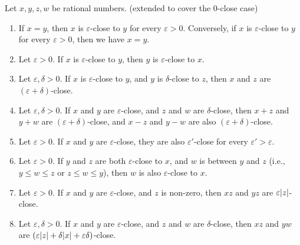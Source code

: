 \setcounter{theorem}{6}
\begin{proposition}\label{4.3.7}
Let \(x, y, z, w\) be rational numbers.
(extended to cover the \(0\)-close case)
\begin{enumerate}
    \item If \(x = y\), then \(x\) is \(\varepsilon\)-close to \(y\) for every \(\varepsilon > 0\).
    Conversely, if \(x\) is \(\varepsilon\)-close to \(y\) for every \(\varepsilon > 0\), then we have \(x = y\).
    \item Let \(\varepsilon > 0\).
    If \(x\) is \(\varepsilon\)-close to \(y\), then \(y\) is \(\varepsilon\)-close to \(x\).
    \item Let \(\varepsilon, \delta > 0\).
    If \(x\) is \(\varepsilon\)-close to \(y\), and \(y\) is \(\delta\)-close to \(z\), then \(x\) and \(z\) are \((\varepsilon + \delta)\)-close.
    \item Let \(\varepsilon, \delta > 0\).
    If \(x\) and \(y\) are \(\varepsilon\)-close, and \(z\) and \(w\) are \(\delta\)-close, then \(x + z\) and \(y + w\) are \((\varepsilon + \delta)\)-close, and \(x - z\) and \(y - w\) are also \((\varepsilon + \delta)\)-close.
    \item Let \(\varepsilon > 0\).
    If \(x\) and \(y\) are \(\varepsilon\)-close, they are also \(\varepsilon'\)-close for every \(\varepsilon' > \varepsilon\).
    \item Let \(\varepsilon > 0\).
    If \(y\) and \(z\) are both \(\varepsilon\)-close to \(x\), and \(w\) is between \(y\) and \(z\) (i.e., \(y \leq w \leq z\) or \(z \leq w \leq y\)), then \(w\) is also \(\varepsilon\)-close to \(x\).
    \item Let \(\varepsilon > 0\).
    If \(x\) and \(y\) are \(\varepsilon\)-close, and \(z\) is non-zero, then \(xz\) and \(yz\) are \(\varepsilon\abs*{z}\)-close.
    \item Let \(\varepsilon, \delta > 0\).
    If \(x\) and \(y\) are \(\varepsilon\)-close, and \(z\) and \(w\) are \(\delta\)-close, then \(xz\) and \(yw\) are \((\varepsilon\abs*{z} + \delta\abs*{x} + \varepsilon\delta)\)-close.
\end{enumerate}
\end{proposition}

